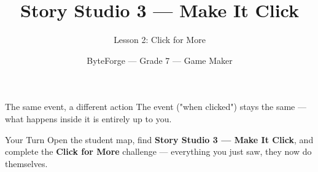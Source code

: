 \documentclass[aspectratio=169]{beamer}
\title{Story Studio 3 — Make It Click}
\subtitle{Lesson 2: Click for More}
\author{ByteForge --- Grade 7 --- Game Maker}
\date{}
\begin{document}
\begin{frame}
    \titlepage
\end{frame}

\begin{frame}{The same event, a different action}
    \Large
    The event ("when clicked") stays the same — what happens inside it is entirely up to you.
\end{frame}

\begin{frame}{Your Turn}
    \Large
    Open the student map, find \textbf{Story Studio 3 — Make It Click}, and complete
    the \textbf{Click for More} challenge --- everything you just saw, they now do themselves.
\end{frame}
\end{document}

